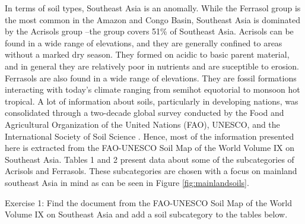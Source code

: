 In terms of soil types, Southeast Asia is an anomally. While the Ferrasol group is the most common in the Amazon and Congo Basin, Southeast Asia is dominated by the Acrisols group \citep{kyuma1966major} --the group covers 51\% of Southeast Asia. Acrisols can be found in a wide range of elevations, and they are generally confined to areas without a marked dry season. They formed on acidic to basic parent material, and in general they are relatively poor in nutrients and are suceptible to erosion. Ferrasols are also found in a wide range of elevations. They are fossil formations interacting with today's climate ranging from semihot equotorial to monsoon hot tropical. A lot of information about soils, particularly in developing nations, was consolidated through a two-decade global survey conducted by the Food and Agricultural Organization of the United Nations (FAO), UNESCO, and the International Society of Soil Science \citep{dudal2005soils}. Hence, most of the information presented here is extracted from the FAO-UNESCO Soil Map of the World Volume IX on Southeast Asia. Tables 1 and 2 present data about some of the subcategories of Acrisols and Ferrasols. These subcategories are chosen with a focus on mainland southeast Asia in mind as can be seen in Figure \ref{fig:mainlandsoils}.

Exercise 1: Find the document from the FAO-UNESCO Soil Map of the World Volume IX on Southeast Asia and add a soil subcategory to the tables below.

